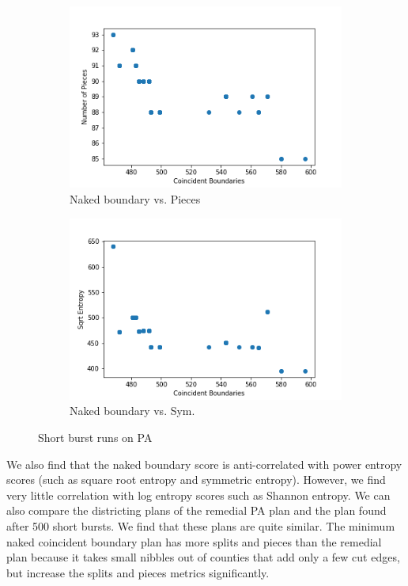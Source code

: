 \documentclass{mgggarticle}
\begin{document}
\begin{figure}[h]
	\begin{subfigure}{0.475\textwidth}
    \centering
    \includegraphics[width=\textwidth]{figs/coin_bound_vs_pieces_5000_10.png}
    \caption{Naked boundary vs. Pieces}
    \end{subfigure}
    	\begin{subfigure}{0.475\textwidth}
\centering
    \includegraphics[width=\textwidth]{figs/coin_bound_vs_power_5_entropy_5000_10.png}
    \caption{Naked boundary vs. Sym.}
\end{subfigure}
\caption{Short burst runs on PA}
\end{figure}

We also find that the naked boundary score is anti-correlated with power entropy scores (such as square root entropy and symmetric entropy). However, we find very little correlation with log entropy scores such as Shannon entropy. We can also compare the districting plans of the remedial PA plan and the plan found after 500 short bursts. We find that these plans are quite similar. The minimum naked coincident boundary plan has more splits and pieces than the remedial plan because it takes small nibbles out of counties that add only a few cut edges, but increase the splits and pieces metrics significantly.
\end{document}
